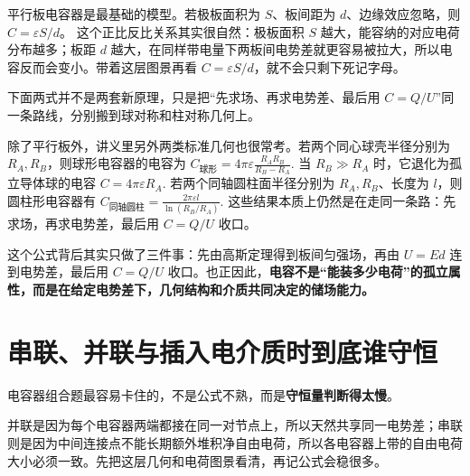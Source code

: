 \documentclass[lang=cn,11pt]{elegantbook}
\begin{document}
平行板电容器是最基础的模型。若极板面积为 \(S\)、板间距为 \(d\)、边缘效应忽略，则
\(C=\varepsilon S/d\)。
这个正比反比关系其实很自然：极板面积 \(S\) 越大，能容纳的对应电荷分布越多；板距 \(d\) 越大，在同样带电量下两板间电势差就更容易被拉大，所以电容反而会变小。带着这层图景再看 \(C=\varepsilon S/d\)，就不会只剩下死记字母。

\begin{remark}
下面两式并不是两套新原理，只是把“先求场、再求电势差、最后用 \(C=Q/U\)”同一条路线，分别搬到球对称和柱对称几何上。
\par
除了平行板外，讲义里另外两类标准几何也很常考。若两个同心球壳半径分别为 \(R_A,R_B\)，则球形电容器的电容为
 \(C_{\text{球形}}=4\pi\varepsilon\frac{R_A R_B}{R_B-R_A}.\) 
当 \(R_B\gg R_A\) 时，它退化为孤立导体球的电容
 \(C=4\pi\varepsilon R_A.\) 
若两个同轴圆柱面半径分别为 \(R_A,R_B\)、长度为 \(l\)，则圆柱形电容器有
 \(C_{\text{同轴圆柱}}=\frac{2\pi\varepsilon l}{\ln(R_B/R_A)}.\) 
这些结果本质上仍然是在走同一条路：先求场，再求电势差，最后用 \(C=Q/U\) 收口。
\end{remark}

\begin{center}
\end{center}

这个公式背后其实只做了三件事：先由高斯定理得到板间匀强场，再由 \(U=Ed\) 连到电势差，最后用 \(C=Q/U\) 收口。也正因此，\textbf{电容不是“能装多少电荷”的孤立属性，而是在给定电势差下，几何结构和介质共同决定的储场能力。}

\section{串联、并联与插入电介质时到底谁守恒}

电容器组合题最容易卡住的，不是公式不熟，而是\textbf{守恒量判断得太慢}。

并联是因为每个电容器两端都接在同一对节点上，所以天然共享同一电势差；串联则是因为中间连接点不能长期额外堆积净自由电荷，所以各电容器上带的自由电荷大小必须一致。先把这层几何和电荷图景看清，再记公式会稳很多。
\end{document}
